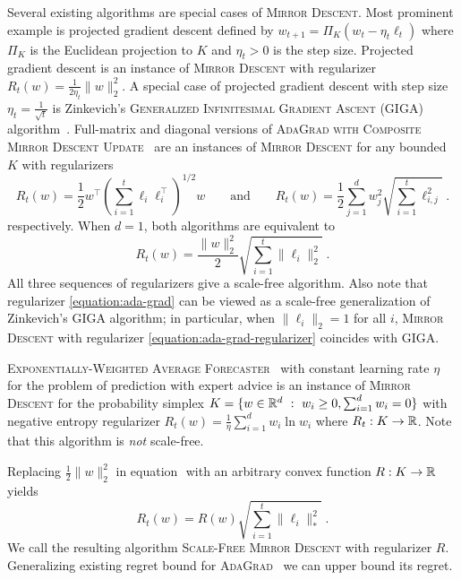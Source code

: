 Several existing algorithms are special cases of \textsc{Mirror Descent}. Most
prominent example is projected gradient descent defined by $w_{t+1} = \Pi_K(w_t
- \eta_t \ell_t)$ where $\Pi_K$ is the Euclidean projection to $K$ and
$\eta_t>0$ is the step size.  Projected gradient descent is an instance of
\textsc{Mirror Descent} with regularizer $R_t(w) = \frac{1}{2\eta_t}\|w\|_2^2$.
A special case of projected gradient descent with step size $\eta_t = \frac{1}{\sqrt{t}}$
is Zinkevich's \textsc{Generalized Infinitesimal Gradient Ascent} (GIGA)
algorithm~\cite{Zinkevich-2003}. Full-matrix and diagonal versions of \textsc{AdaGrad with Composite Mirror
Descent Update}~\cite{Duchi-Hazan-Singer-2011} are an instances of
\textsc{Mirror Descent} for any bounded $K$ with regularizers
$$
R_t(w) = \frac{1}{2} w^\top \left(\sum_{i=1}^t \ell_i \ell_i^\top \right)^{1/2} \!\!\!\! w
\qquad \text{and} \qquad
R_t(w) = \frac{1}{2} \sum_{j=1}^d w_j^2 \sqrt{ \sum_{i=1}^t \ell_{i,j}^2} \; .
$$
respectively. When $d=1$, both algorithms are equivalent to
\begin{equation}
\label{equation:ada-grad-regularizer}
R_t(w) = \frac{\|w\|_2^2}{2} \sqrt{\sum_{i=1}^t \|\ell_i\|_2^2 } \; .
\end{equation}
All three sequences of regularizers give a scale-free algorithm.
Also note that regularizer \eqref{equation:ada-grad} can be viewed
as a scale-free generalization of Zinkevich's GIGA algorithm; in particular, when $\|\ell_i\|_2 = 1$ for all $i$,
\textsc{Mirror Descent} with regularizer \eqref{equation:ada-grad-regularizer} coincides with GIGA.

\textsc{Exponentially-Weighted Average Forecaster}~\cite[Chapter
2]{Cesa-Bianchi-Lugosi-2006} with constant learning rate $\eta$ for the problem
of prediction with expert advice is an instance of \textsc{Mirror Descent} for
the probability simplex $K = \{ w \in \mathbb{R}^d ~:~ w_i \ge 0, \sum_{i=1}^d w_i = 0
\}$ with negative entropy regularizer $R_t(w) = \frac{1}{\eta} \sum_{i=1}^d w_i
\ln w_i$ where $R_t:K \to \mathbb{R}$. Note that this algorithm is \emph{not} scale-free.

Replacing $\frac{1}{2}\|w\|_2^2$ in equation $\label{equation:ada-grad}$
with an arbitrary convex function $R:K \to \mathbb{R}$ yields
\begin{equation}
\label{equation:scale-free-mirror-descent}
R_t(w) = R(w) \sqrt{\sum_{i=1}^t \|\ell_i\|_*^2} \; .
\end{equation}
We call the resulting algorithm \textsc{Scale-Free Mirror Descent} with regularizer $R$.
Generalizing existing regret bound for
\textsc{AdaGrad}~\cite{Duchi-Hazan-Singer-2011} we can upper bound its regret.

